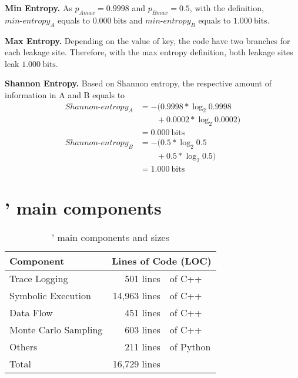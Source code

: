 \vspace{3pt}
\textbf{Min Entropy.}
As $p_{A\mathit{max}} = 0.9998$ and $p_{B\mathit{max}} = 0.5$, 
with the definition, $\mathit{min\text{-}entropy_A}$ equals to
$0.000\ \mathrm{bits}$ and $\mathit{min\text{-}entropy_B}$ equals to
$1.000\ \mathrm{bits}$.

\textbf{Max Entropy.}
Depending on the value of key, the code have two branches for each leakage site. 
Therefore, with the max entropy definition, both leakage sites leak $1.000\ \mathrm{bits}$.

\textbf{Shannon Entropy.}
Based on Shannon entropy, the respective amount of information in A and B equals to
{\footnotesize
\begin{align*}
    \mathit{Shannon\text{-}entropy_A} & = -(0.9998*\log_{2}0.9998      \\
                                    & \qquad+ 0.0002*\log_{2}0.0002)  \\
                                    & = 0.000\ \mathrm{bits}         \\
    \mathit{Shannon\text{-}entropy_B} & = -(0.5*\log_{2}0.5      \\
                                    & \qquad+ 0.5*\log_{2}0.5)        \\
                                    & = 1.000\ \mathrm{bits}                             
\end{align*}
}

\section{\tool{}' main components}

\label{appendix:code}
\begin{table}[h!]
    \centering
    \caption{\tool{}' main components and sizes}\label{tbl:implementation}
    \begin{tabular}{lr@{~}@{}l}
        \hline
        Component            & \multicolumn{2}{c}{Lines of Code (LOC)}             \\ \hline
        Trace Logging        & 501 lines                               & of C++    \\
        Symbolic Execution   & 14,963 lines                            & of C++    \\
        Data Flow            & 451 lines                               & of C++    \\
        Monte Carlo Sampling & 603 lines                               & of C++    \\
        Others               & 211 lines                               & of Python \\ \hline
        Total                & 16,729 lines                            &           \\\hline
    \end{tabular}
\end{table}



